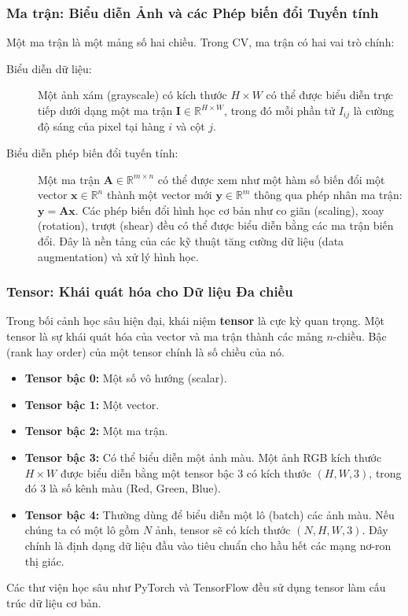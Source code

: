 \subsubsection{Ma trận: Biểu diễn Ảnh và các Phép biến đổi Tuyến tính}
Một ma trận là một mảng số hai chiều. Trong CV, ma trận có hai vai trò chính:
\begin{description}
    \item[Biểu diễn dữ liệu:] Một ảnh xám (grayscale) có kích thước $H \times W$ có thể được biểu diễn trực tiếp dưới dạng một ma trận $\mathbf{I} \in \mathbb{R}^{H \times W}$, trong đó mỗi phần tử $I_{ij}$ là cường độ sáng của pixel tại hàng $i$ và cột $j$.
    \item[Biểu diễn phép biến đổi tuyến tính:] Một ma trận $\mathbf{A} \in \mathbb{R}^{m \times n}$ có thể được xem như một hàm số biến đổi một vector $\mathbf{x} \in \mathbb{R}^n$ thành một vector mới $\mathbf{y} \in \mathbb{R}^m$ thông qua phép nhân ma trận: $\mathbf{y} = \mathbf{A}\mathbf{x}$. Các phép biến đổi hình học cơ bản như co giãn (scaling), xoay (rotation), trượt (shear) đều có thể được biểu diễn bằng các ma trận biến đổi. Đây là nền tảng của các kỹ thuật tăng cường dữ liệu (data augmentation) và xử lý hình học.
\end{description}

\subsubsection{Tensor: Khái quát hóa cho Dữ liệu Đa chiều}
Trong bối cảnh học sâu hiện đại, khái niệm \textbf{tensor} là cực kỳ quan trọng. Một tensor là sự khái quát hóa của vector và ma trận thành các mảng $n$-chiều. Bậc (rank hay order) của một tensor chính là số chiều của nó.
\begin{itemize}
    \item \textbf{Tensor bậc 0:} Một số vô hướng (scalar).
    \item \textbf{Tensor bậc 1:} Một vector.
    \item \textbf{Tensor bậc 2:} Một ma trận.
    \item \textbf{Tensor bậc 3:} Có thể biểu diễn một ảnh màu. Một ảnh RGB kích thước $H \times W$ được biểu diễn bằng một tensor bậc 3 có kích thước $(H, W, 3)$, trong đó 3 là số kênh màu (Red, Green, Blue).
    \item \textbf{Tensor bậc 4:} Thường dùng để biểu diễn một lô (batch) các ảnh màu. Nếu chúng ta có một lô gồm $N$ ảnh, tensor sẽ có kích thước $(N, H, W, 3)$. Đây chính là định dạng dữ liệu đầu vào tiêu chuẩn cho hầu hết các mạng nơ-ron thị giác.
\end{itemize}
Các thư viện học sâu như PyTorch và TensorFlow đều sử dụng tensor làm cấu trúc dữ liệu cơ bản.

